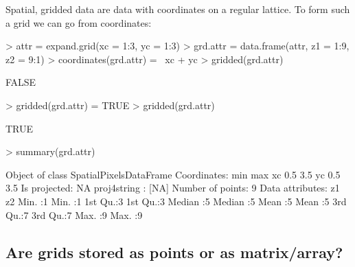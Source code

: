 \documentclass{article}
\begin{document}
Spatial, gridded data are data with coordinates on a regular lattice.
To form such a grid we can go from coordinates:
\begin{Schunk}
\begin{Sinput}
> attr = expand.grid(xc = 1:3, yc = 1:3)
> grd.attr = data.frame(attr, z1 = 1:9, z2 = 9:1)
> coordinates(grd.attr) = ~xc + yc
> gridded(grd.attr)
\end{Sinput}
\begin{Soutput}
[1] FALSE

\end{Soutput}
\begin{Sinput}
> gridded(grd.attr) = TRUE
> gridded(grd.attr)
\end{Sinput}
\begin{Soutput}
[1] TRUE

\end{Soutput}
\begin{Sinput}
> summary(grd.attr)
\end{Sinput}
\begin{Soutput}
Object of class SpatialPixelsDataFrame
Coordinates:
   min max
xc 0.5 3.5
yc 0.5 3.5
Is projected: NA 
proj4string : [NA]
Number of points: 9
Data attributes:
       z1          z2   
 Min.   :1   Min.   :1  
 1st Qu.:3   1st Qu.:3  
 Median :5   Median :5  
 Mean   :5   Mean   :5  
 3rd Qu.:7   3rd Qu.:7  
 Max.   :9   Max.   :9  

\end{Soutput}
\end{Schunk}

\subsection{Are grids stored as points or as matrix/array?}
\end{document}
